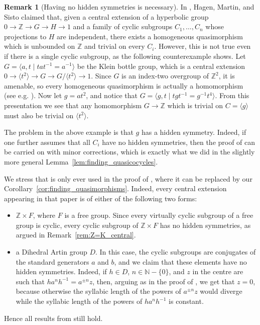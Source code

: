 \documentclass[svgnames]{amsart}
\theoremstyle{plain}
\theoremstyle{definition}
\newtheorem{rem}[thm]{Remark}
\newcommand{\Z}{\mathbb{Z}}
\begin{document}
\begin{rem}[Having no hidden symmetries is necessary]\label{rem:error_in_ELTAG}
    In \cite[Lemma 4.4]{ELTAG_HHS}, Hagen, Martin, and Sisto claimed that, given a central extension of a hyperbolic group $0\to \Z\to G\to H\to 1$ and a family of cyclic subgroups $C_1,\ldots,C_n$ whose projections to $H$ are independent, there exists a homogeneous quasimorphism which is unbounded on $\Z$ and trivial on every $C_i$. However, this is not true even if there is a single cyclic subgroup, as the following counterexample shows. Let $G=\langle a,t\mid tat^{-1}=a^{-1}\rangle$ be the Klein bottle group, which is a central extension $0\to \langle t^2\rangle \to G\to G/\langle t^2\rangle\to 1$. Since $G$ is an index-two overgroup of $\Z^2$, it is amenable, so every homogeneous quasimorphism is actually a homomorphism (see e.g. \cite[Corollary 3.8]{frigerio}). Now let $g=at^2$, and notice that $G=\langle g,t\mid tgt^{-1}=g^{-1}t^4\rangle$. From this presentation we see that any homomorphism $G\to \Z$ which is trivial on $C=\langle g\rangle$ must also be trivial on $\langle t^2\rangle$. 

    The problem in the above example is that $g$ has a hidden symmetry. Indeed, if one further assumes that all $C_i$ have no hidden symmetries, then the proof of \cite[Lemma 4.4]{ELTAG_HHS} can be carried on with minor corrections, which is exactly what we did in the slightly more general Lemma~\ref{lem:finding_quasicocycles}. 
    
    We stress that \cite[Lemma 4.4]{ELTAG_HHS} is only ever used in the proof of \cite[Lemma 4.5]{ELTAG_HHS}, where it can be replaced by our Corollary~\ref{cor:finding_quasimorphisms}. Indeed, every central extension appearing in that paper is of either of the following two forms:
    \begin{itemize}
        \item $\Z\times F$, where $F$ is a free group. Since every virtually cyclic subgroup of a free group is cyclic, every cyclic subgroup of $\Z\times F$ has no hidden symmetries, as argued in Remark~\ref{rem:Z=K_central}.
        \item a Dihedral Artin group $D$. In this case, the cyclic subgroups are conjugates of the standard generators $a$ and $b$, and we claim that these elements have no hidden symmetries. Indeed, if $h\in D$, $n\in \mathbb{N}-\{0\}$, and $z$ in the centre are such that $ha^nh^{-1}=a^{\pm n}z$, then, arguing as in the proof of  \cite[Lemma 2.8]{ELTAG_HHS}, we get that $z=0$, because otherwise the syllabic length of the powers of $a^{\pm n}z$ would diverge while the syllabic length of the powers of $ha^nh^{-1}$ is constant. 
    \end{itemize}
    Hence all results from \cite{ELTAG_HHS} still hold.
\end{rem}







\end{document}
